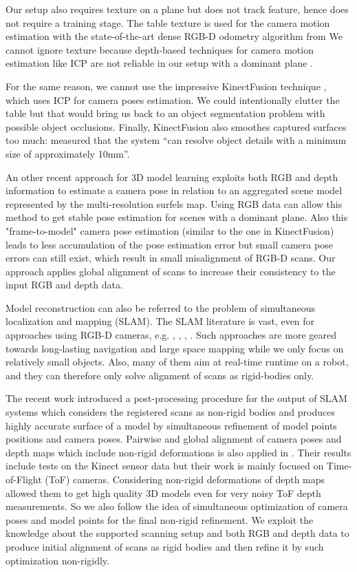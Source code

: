 \documentclass[letterpaper, 10 pt, conference]{ieeeconf}  %
\begin{document}
Our setup also requires 
texture on a plane but does not track feature, hence does not require a training stage.
The table texture is used for the camera motion estimation 
with the state-of-the-art dense RGB-D odometry algorithm from \cite{steinbrucker2011real} 
We cannot ignore texture because depth-based
techniques for camera motion estimation like ICP \cite{besl1992method} 
are not reliable in our setup with a dominant plane \cite{rusinkiewicz2001efficient}.


For the same reason, we cannot use
the impressive KinectFusion technique \cite{newcombe2011kinectfusion},
which uses ICP for camera poses estimation.
We could intentionally clutter the table but that would bring us back to
an object segmentation problem with possible object occlusions.
Finally, KinectFusion also smoothes captured surfaces too much: \cite{meister2012when} measured that
the system ``can resolve object details with a minimum size of approximately 10mm''.

An other recent approach \cite{stuckler2012model} for 3D model learning 
exploits both RGB and depth information to estimate a camera pose 
in relation to an aggregated scene model represented by the multi-resolution surfels map.
Using RGB data can allow this method to get stable pose estimation
for scenes with a dominant plane. Also this "frame-to-model" camera pose estimation (similar to the one in 
KinectFusion) leads to less accumulation of the pose estimation error
but small camera pose errors can still exist, which result in
small misalignment of RGB-D scans. Our approach applies global alignment of scans
to increase their consistency to the input RGB and depth data.

Model reconstruction can also be referred to the problem of simultaneous localization
and mapping (SLAM). The SLAM literature is vast, even for approaches using RGB-D
cameras, e.g. \cite{stuckler2012integrating},
\cite{endres2012evaluation}, \cite{henry2012rgb}, \cite{strasdat2011double}. Such approaches are more geared
towards long-lasting navigation and large space mapping while we only focus on relatively small objects.
Also, many of them aim at
real-time runtime on a robot, and they can therefore only solve alignment of scans 
as rigid-bodies only. 

The recent work \cite{ruhnke2012highly} introduced a post-processing procedure for the output of SLAM systems
which considers the registered scans as non-rigid bodies and produces highly accurate
surface of a model by simultaneous refinement of model points positions and camera poses.
Pairwise and global alignment of camera poses and depth maps which include non-rigid 
deformations is also applied in \cite{cui2012algorithms}. Their results include tests on the Kinect
sensor data but their work is mainly focused on Time-of-Flight (ToF) cameras. Considering non-rigid deformations 
of depth maps allowed them to get high quality 3D models even for very noisy ToF depth measurements.
So we also follow the idea of simultaneous optimization of camera poses and model points 
for the final non-rigid refinement. We exploit the knowledge 
about the supported scanning setup and both RGB and depth 
data to produce initial alignment of scans as rigid bodies
and then refine it by such optimization non-rigidly.
\end{document}
